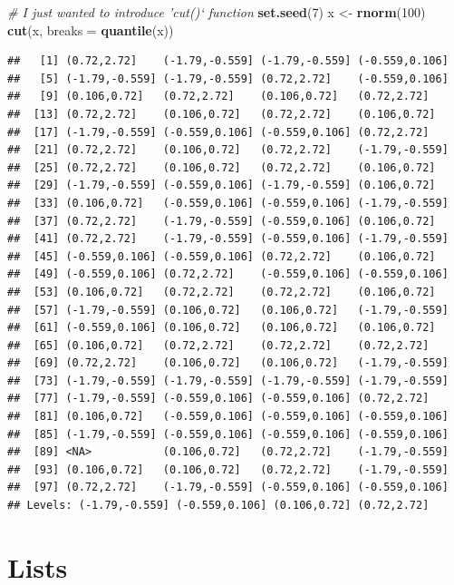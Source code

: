 \documentclass[]{book}
\newenvironment{Shaded}{\begin{snugshade}}{\end{snugshade}}
\newcommand{\CommentTok}[1]{\textcolor[rgb]{0.56,0.35,0.01}{\textit{#1}}}
\newcommand{\DataTypeTok}[1]{\textcolor[rgb]{0.13,0.29,0.53}{#1}}
\newcommand{\DecValTok}[1]{\textcolor[rgb]{0.00,0.00,0.81}{#1}}
\newcommand{\KeywordTok}[1]{\textcolor[rgb]{0.13,0.29,0.53}{\textbf{#1}}}
\newcommand{\NormalTok}[1]{#1}
\newcommand{\StringTok}[1]{\textcolor[rgb]{0.31,0.60,0.02}{#1}}
\begin{document}
\begin{Shaded}
\begin{Highlighting}[]
\CommentTok{# I just wanted to introduce 'cut()` function}
\KeywordTok{set.seed}\NormalTok{(}\DecValTok{7}\NormalTok{)}
\NormalTok{x <-}\StringTok{ }\KeywordTok{rnorm}\NormalTok{(}\DecValTok{100}\NormalTok{)}
\KeywordTok{cut}\NormalTok{(x, }\DataTypeTok{breaks =} \KeywordTok{quantile}\NormalTok{(x))}
\end{Highlighting}
\end{Shaded}

\begin{verbatim}
##   [1] (0.72,2.72]    (-1.79,-0.559] (-1.79,-0.559] (-0.559,0.106]
##   [5] (-1.79,-0.559] (-1.79,-0.559] (0.72,2.72]    (-0.559,0.106]
##   [9] (0.106,0.72]   (0.72,2.72]    (0.106,0.72]   (0.72,2.72]   
##  [13] (0.72,2.72]    (0.106,0.72]   (0.72,2.72]    (0.106,0.72]  
##  [17] (-1.79,-0.559] (-0.559,0.106] (-0.559,0.106] (0.72,2.72]   
##  [21] (0.72,2.72]    (0.106,0.72]   (0.72,2.72]    (-1.79,-0.559]
##  [25] (0.72,2.72]    (0.106,0.72]   (0.72,2.72]    (0.106,0.72]  
##  [29] (-1.79,-0.559] (-0.559,0.106] (-1.79,-0.559] (0.106,0.72]  
##  [33] (0.106,0.72]   (-0.559,0.106] (-0.559,0.106] (-1.79,-0.559]
##  [37] (0.72,2.72]    (-1.79,-0.559] (-0.559,0.106] (0.106,0.72]  
##  [41] (0.72,2.72]    (-1.79,-0.559] (-0.559,0.106] (-1.79,-0.559]
##  [45] (-0.559,0.106] (-0.559,0.106] (0.72,2.72]    (0.106,0.72]  
##  [49] (-0.559,0.106] (0.72,2.72]    (-0.559,0.106] (-0.559,0.106]
##  [53] (0.106,0.72]   (0.72,2.72]    (0.72,2.72]    (0.106,0.72]  
##  [57] (-1.79,-0.559] (0.106,0.72]   (0.106,0.72]   (-1.79,-0.559]
##  [61] (-0.559,0.106] (0.106,0.72]   (0.106,0.72]   (0.106,0.72]  
##  [65] (0.106,0.72]   (0.72,2.72]    (0.72,2.72]    (0.72,2.72]   
##  [69] (0.72,2.72]    (0.106,0.72]   (0.106,0.72]   (-1.79,-0.559]
##  [73] (-1.79,-0.559] (-1.79,-0.559] (-1.79,-0.559] (-1.79,-0.559]
##  [77] (-1.79,-0.559] (-0.559,0.106] (-0.559,0.106] (0.72,2.72]   
##  [81] (0.106,0.72]   (-0.559,0.106] (-0.559,0.106] (-0.559,0.106]
##  [85] (-1.79,-0.559] (-0.559,0.106] (-0.559,0.106] (-0.559,0.106]
##  [89] <NA>           (0.106,0.72]   (0.72,2.72]    (-1.79,-0.559]
##  [93] (0.106,0.72]   (0.106,0.72]   (0.72,2.72]    (-1.79,-0.559]
##  [97] (0.72,2.72]    (-1.79,-0.559] (-0.559,0.106] (-0.559,0.106]
## Levels: (-1.79,-0.559] (-0.559,0.106] (0.106,0.72] (0.72,2.72]
\end{verbatim}

\hypertarget{lists}{%
\section{Lists}\label{lists}}
\end{document}
